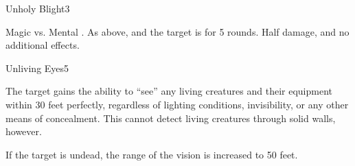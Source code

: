 \begin{spellsection}{Unholy Blight}{3}
    \begin{spellheader}
    \end{spellheader}
    \begin{spellcontent}
        \begin{spelltargetinginfo}
        \end{spelltargetinginfo}
        \begin{spelleffects}
            \begin{spellattack}{Magic vs. Mental}
                \spellsuccess {}.
                \spellcritical As above, and the target is \staggered for 5 rounds.
                \spellfailure Half damage, and no additional effects.
            \end{spellattack}
        \end{spelleffects}
    \end{spellcontent}
    \begin{spellfooter}
        \miscastrandom
    \end{spellfooter}
\end{spellsection}

\begin{spellsection}{Unliving Eyes}{5}
    \begin{spellheader}
    \end{spellheader}
    \begin{spellcontent}
        \begin{spelltargetinginfo}
        \end{spelltargetinginfo}
        \begin{spelleffects}
            \spelleffect The target gains the ability to ``see'' any living creatures and their equipment within 30 feet perfectly, regardless of lighting conditions, invisibility, or any other means of concealment. This cannot detect living creatures through solid walls, however.

            If the target is undead, the range of the vision is increased to 50 feet.
            \spelldur \durpersonallong
        \end{spelleffects}
    \end{spellcontent}
    \begin{spellfooter}
        \miscastexplode
    \end{spellfooter}
\end{spellsection}


